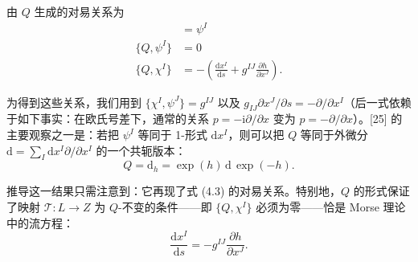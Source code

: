 \documentclass[11pt,a4paper,UTF8]{ctexart}
\theoremstyle{plain}
\theoremstyle{definition}
\begin{document}
由 $Q$ 生成的对易关系为
\begin{align}
    [Q,x^I] &= \psi^I\nonumber\\
    \{Q,\psi^I\} &= 0
    \tag{4.3}\\
    \{Q,\chi^I\} &= -\left(\frac{\mathrm{d}x^I}{\mathrm{d}s}
    +g^{IJ}\frac{\partial h}{\partial x^J}\right).\nonumber
\end{align}

为得到这些关系，我们用到 $\{\chi^I,\psi^J\}=g^{IJ}$ 以及 $g_{IJ}\partial x^J/\partial s=-\partial/\partial x^I$（后一式依赖于如下事实：在欧氏号差下，通常的关系 $p=-\mathrm{i}\partial/\partial x$ 变为 $p=-\partial/\partial x$）。[25] 的主要观察之一是：若把 $\psi^I$ 等同于 1-形式 $\mathrm{d}x^I$，则可以把 $Q$ 等同于外微分 $\mathrm{d}=\sum_I \mathrm{d}x^I\partial/\partial x^I$ 的一个共轭版本：
\begin{equation}
    Q=\mathrm{d}_h=\exp(h)\,\mathrm{d}\,\exp(-h).
    \tag{4.4}
\end{equation}

推导这一结果只需注意到：它再现了式 (4.3) 的对易关系。特别地，$Q$ 的形式保证了映射 $\mathcal{T}:L\to Z$ 为 $Q$-不变的条件——即 $\{Q,\chi^I\}$ 必须为零——恰是 Morse 理论中的流方程：
\begin{equation}
    \frac{\mathrm{d}x^I}{\mathrm{d}s}=-g^{IJ}\frac{\partial h}{\partial x^J}.
    \tag{4.5}
\end{equation}


\end{document}
